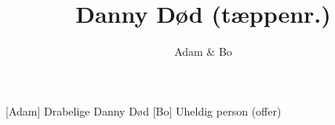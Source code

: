 \documentclass[a4paper]{article}
\title{Danny Død (tæppenr.)}
\author{Adam \& Bo}
\begin{document}
\maketitle

\begin{roles}
  [Adam] Drabelige Danny Død
  [Bo] Uheldig person (offer)
\end{roles}

\begin{sketch}
\end{sketch}
\end{document}
